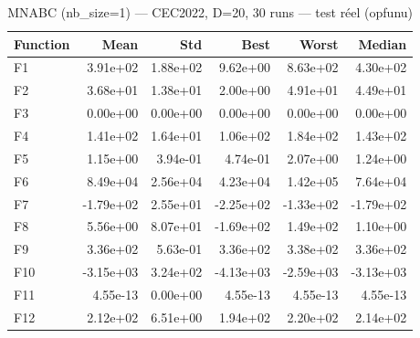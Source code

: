 \begin{table}[htbp]
\centering
\caption{MNABC (nb\_size=1) — CEC2022, D=20, 30 runs — test réel (opfunu)}
\label{tab:mnabc_nb1_D20_real}
\begin{tabular}{lrrrrr}
\toprule
Function & Mean & Std & Best & Worst & Median \\
\midrule
F1 & 3.91e+02 & 1.88e+02 & 9.62e+00 & 8.63e+02 & 4.30e+02 \\
F2 & 3.68e+01 & 1.38e+01 & 2.00e+00 & 4.91e+01 & 4.49e+01 \\
F3 & 0.00e+00 & 0.00e+00 & 0.00e+00 & 0.00e+00 & 0.00e+00 \\
F4 & 1.41e+02 & 1.64e+01 & 1.06e+02 & 1.84e+02 & 1.43e+02 \\
F5 & 1.15e+00 & 3.94e-01 & 4.74e-01 & 2.07e+00 & 1.24e+00 \\
F6 & 8.49e+04 & 2.56e+04 & 4.23e+04 & 1.42e+05 & 7.64e+04 \\
F7 & -1.79e+02 & 2.55e+01 & -2.25e+02 & -1.33e+02 & -1.79e+02 \\
F8 & 5.56e+00 & 8.07e+01 & -1.69e+02 & 1.49e+02 & 1.10e+00 \\
F9 & 3.36e+02 & 5.63e-01 & 3.36e+02 & 3.38e+02 & 3.36e+02 \\
F10 & -3.15e+03 & 3.24e+02 & -4.13e+03 & -2.59e+03 & -3.13e+03 \\
F11 & 4.55e-13 & 0.00e+00 & 4.55e-13 & 4.55e-13 & 4.55e-13 \\
F12 & 2.12e+02 & 6.51e+00 & 1.94e+02 & 2.20e+02 & 2.14e+02 \\
\bottomrule
\end{tabular}
\end{table}